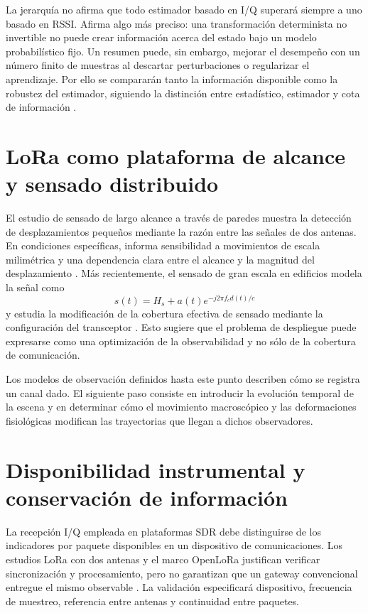 La jerarquía no afirma que todo estimador basado en I/Q superará siempre a uno basado en RSSI. Afirma algo más preciso: una transformación determinista no invertible no puede crear información acerca del estado bajo un modelo probabilístico fijo. Un resumen puede, sin embargo, mejorar el desempeño con un número finito de muestras al descartar perturbaciones o regularizar el aprendizaje. Por ello se compararán tanto la información disponible como la robustez del estimador, siguiendo la distinción entre estadístico, estimador y cota de información \citep{Kay1993,CoverThomas2006}.

\section{LoRa como plataforma de alcance y sensado distribuido}

El estudio de sensado de largo alcance a través de paredes muestra la detección de desplazamientos pequeños mediante la razón entre las señales de dos antenas. En condiciones específicas, informa sensibilidad a movimientos de escala milimétrica y una dependencia clara entre el alcance y la magnitud del desplazamiento \citep{Zhang2020LoRa}. Más recientemente, el sensado de gran escala en edificios modela la señal como
\begin{equation}
s(t)=H_s+a(t)e^{-j2\pi f_cd(t)/c}
\end{equation}
y estudia la modificación de la cobertura efectiva de sensado mediante la configuración del transceptor \citep{Xue2025LargeScaleLoRa}. Esto sugiere que el problema de despliegue puede expresarse como una optimización de la observabilidad y no sólo de la cobertura de comunicación.

Los modelos de observación definidos hasta este punto describen cómo se registra un canal
dado. El siguiente paso consiste en introducir la evolución temporal de la escena y en
determinar cómo el movimiento macroscópico y las deformaciones fisiológicas modifican
las trayectorias que llegan a dichos observadores.

\section{Disponibilidad instrumental y conservación de información}

La recepción I/Q empleada en plataformas SDR debe distinguirse de los indicadores
por paquete disponibles en un dispositivo de comunicaciones. Los estudios LoRa con
dos antenas y el marco OpenLoRa justifican verificar sincronización y procesamiento,
pero no garantizan que un gateway convencional entregue el mismo observable
\citep{Zhang2020LoRa,Mishra2023OpenLoRa}. La validación especificará dispositivo,
frecuencia de muestreo, referencia entre antenas y continuidad entre paquetes.

